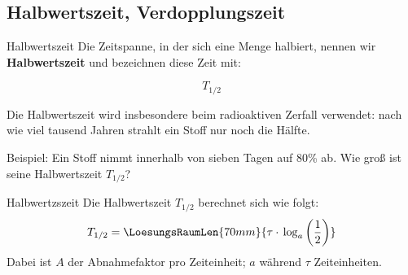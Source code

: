\newpage

\subsection{Halbwertszeit, Verdopplungszeit}

\begin{definition}{Halbwertszeit}{}
Die Zeitspanne, in der sich eine Menge halbiert, nennen wir
\textbf{Halbwertszeit} und bezeichnen diese Zeit mit:

$$T_{1/2}$$
\end{definition}

Die Halbwertszeit wird insbesondere
  beim radioaktiven Zerfall verwendet: nach wie viel tausend Jahren strahlt
  ein Stoff nur noch die Hälfte.


Beispiel: Ein Stoff nimmt innerhalb von sieben Tagen auf 80\% ab. Wie
groß ist seine Halbwertszeit $T_{1/2}$?

\newpage




\begin{gesetz}{Halbwertzszeit}{}
  Die Halbwertszeit $T_{1/2}$ berechnet sich wie folgt:
  $$T_{1/2} = \LoesungsRaumLen{70mm}{\tau \cdot{} \log_a\left(\frac12\right)}$$
  Dabei ist $A$ der Abnahmefaktor pro Zeiteinheit; $a$ während $\tau$ Zeiteinheiten.
\end{gesetz}

